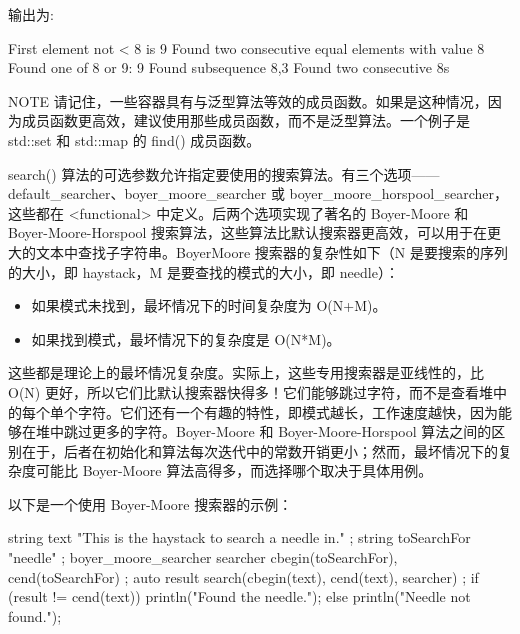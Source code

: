 输出为:

\begin{shell}
First element not < 8 is 9
Found two consecutive equal elements with value 8
Found one of 8 or 9: 9
Found subsequence {8,3}
Found two consecutive 8s
\end{shell}

\begin{myNotic}{NOTE}
请记住，一些容器具有与泛型算法等效的成员函数。如果是这种情况，因为成员函数更高效，建议使用那些成员函数，而不是泛型算法。一个例子是 std::set 和 std::map 的 find() 成员函数。
\end{myNotic}


search() 算法的可选参数允许指定要使用的搜索算法。有三个选项——default\_searcher、boyer\_moore\_searcher 或 boyer\_moore\_horspool\_searcher，这些都在 <functional> 中定义。后两个选项实现了著名的 Boyer-Moore 和 Boyer-Moore-Horspool 搜索算法，这些算法比默认搜索器更高效，可以用于在更大的文本中查找子字符串。BoyerMoore 搜索器的复杂性如下（N 是要搜索的序列的大小，即 haystack，M 是要查找的模式的大小，即 needle）：

\begin{itemize}
\item
如果模式未找到，最坏情况下的时间复杂度为 O(N+M)。

\item
如果找到模式，最坏情况下的复杂度是 O(N*M)。
\end{itemize}

这些都是理论上的最坏情况复杂度。实际上，这些专用搜索器是亚线性的，比 O(N) 更好，所以它们比默认搜索器快得多！它们能够跳过字符，而不是查看堆中的每个单个字符。它们还有一个有趣的特性，即模式越长，工作速度越快，因为能够在堆中跳过更多的字符。Boyer-Moore 和 Boyer-Moore-Horspool 算法之间的区别在于，后者在初始化和算法每次迭代中的常数开销更小；然而，最坏情况下的复杂度可能比 Boyer-Moore 算法高得多，而选择哪个取决于具体用例。

以下是一个使用 Boyer-Moore 搜索器的示例：

\begin{cpp}
string text { "This is the haystack to search a needle in." };
string toSearchFor { "needle" };
boyer_moore_searcher searcher { cbegin(toSearchFor), cend(toSearchFor) };
auto result { search(cbegin(text), cend(text), searcher) };
if (result != cend(text)) {
    println("Found the needle.");
} else {
    println("Needle not found.");
}
\end{cpp}


